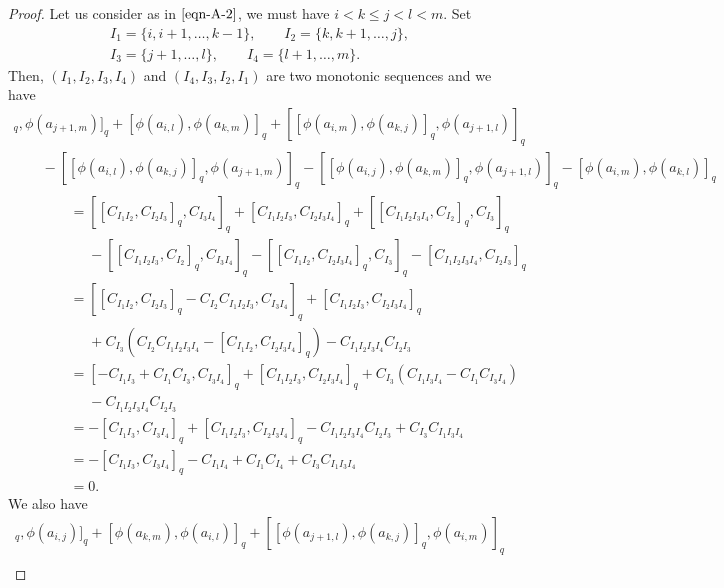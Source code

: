 \documentclass[pdftex]{sigma}
\numberwithin{equation}{section}
\def\lrb#1{\left(#1\right)}
\def\A{\mathscr{A}}
\begin{document}
\begin{proof}
Let us consider \smash{$\A_{i,k,j+1}^{j,l,m}$} as in $\eqref{eqn-A-2}$, we must have
$ i < k \leq j < l < m $. Set
\begin{gather*}
I_1=\{i, i+1, \dots, k-1\}, \qquad I_2=\{k, k+1, \dots, j\},\\
 I_3=\{ j+1, \dots, l\},\qquad I_4=\{l+1, \dots, m\}.
\end{gather*}
Then, $(I_1, I_2, I_3, I_4)$ and $(I_4, I_3, I_2, I_1)$ are two monotonic sequences and we have
 \begin{gather*}
 [ [\phi(a_{i, j}), \phi(a_{k, l}) ]_q, \phi(a_{j+1, m}) ]_q+ [\phi(a_{i,l}),\phi(a_{k,m}) ]_q+ [ [\phi(a_{i, m}), \phi(a_{k, j}) ]_q, \phi(a_{j+1, l}) ]_q \\
 \qquad - [ [ \phi(a_{i, l }), \phi(a_{k,j}) ]_q, \phi(a_{j+1, m}) ]_q - [ [ \phi(a_{i, j}), \phi(a_{k, m}) ]_q, \phi(a_{j+1, l}) ]_q - [\phi(a_{i, m}), \phi(a_{k, l}) ]_q\\
\phantom{\qquad\qquad}{} = [ [C_{I_1I_2}, C_{I_2I_3} ]_q, C_{I_3I_4} ]_q+ [C_{I_1I_2I_3},C_{I_2I_3I_4} ]_q+ [ [C_{I_1I_2I_3I_4}, C_{I_2} ]_q, C_{I_3} ]_q \\
 \phantom{\qquad\qquad=}{} - [ [ C_{I_1I_2I_3}, C_{I_2} ]_q, C_{I_3I_4} ]_q - [ [ C_{I_1I_2}, C_{I_2I_3I_4} ]_q, C_{I_3} ]_q - [C_{I_1I_2I_3I_4}, C_{I_2I_3} ]_q\\
\phantom{\qquad\qquad}{} = [ [C_{I_1I_2}, C_{I_2I_3} ]_q-C_{I_2}C_{I_1I_2I_3}, C_{I_3I_4} ]_q
+ [C_{I_1I_2I_3},C_{I_2I_3I_4} ]_q \\
 \phantom{\qquad\qquad=}{} + C_{I_3} \lrb{ C_{I_2} C_{I_1I_2I_3I_4}- [ C_{I_1I_2}, C_{I_2I_3I_4} ]_q }- C_{I_1I_2I_3I_4} C_{I_2I_3}\\
 \phantom{\qquad\qquad}{} = [-C_{I_1I_3}+C_{I_1}C_{I_3},C_{I_3I_4} ]_q + [C_{I_1I_2I_3},C_{I_2I_3I_4} ]_q + C_{I_3} \lrb{C_{I_1I_3I_4} -C_{I_1} C_{I_3I_4} }\\
 \phantom{\qquad\qquad=}{}- C_{I_1I_2I_3I_4} C_{I_2I_3}\\
 \phantom{\qquad\qquad}{} = - [C_{I_1I_3},C_{I_3I_4} ]_q + [C_{I_1I_2I_3},C_{I_2I_3I_4} ]_q- C_{I_1I_2I_3I_4} C_{I_2I_3} + C_{I_3} C_{I_1I_3I_4} \\
 \phantom{\qquad\qquad}{} = - [C_{I_1I_3},C_{I_3I_4} ]_q -C_{I_1I_4}+C_{I_1} C_{I_4} + C_{I_3} C_{I_1I_3I_4}\\
 \phantom{\qquad\qquad}{} = 0.
\end{gather*}
We also have
 \begin{gather*}
 [ [\phi(a_{j+1, m}), \phi(a_{k, l}) ]_q, \phi(a_{i, j}) ]_q+ [\phi(a_{k,m}), \phi(a_{i,l}) ]_q + [ [\phi(a_{j+1, l}), \phi(a_{k, j}) ]_q, \phi(a_{i, m}) ]_q \\

\end{gather*}
\end{proof}
\end{document}
